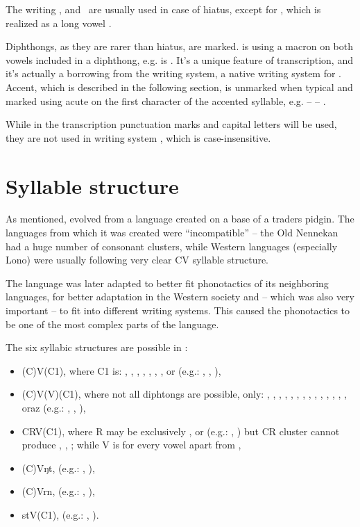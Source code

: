 \skipline

The writing ,  and~ are usually used in case of hiatus,
except for , which is realized as a long vowel .

Diphthongs, as they are rarer than hiatus, are marked.  is using
a macron on both vowels included in a diphthong, e.g.  is . It's a
unique feature of transcription, and it's actually a borrowing from the
 writing system, a native writing system for \andro. Accent, which
is described in the following section, is unmarked when typical and marked using
acute on the first character of the accented syllable, e.g. 
--  -- .

While in the transcription punctuation marks and capital letters will be used,
they are not used in writing system , which is case-insensitive.

\section{Syllable structure}

As mentioned, \andro evolved from a language created on a base of a traders
pidgin. The languages from which it was created were ``incompatible'' -- the Old
Nennekan had a huge number of consonant clusters, while Western languages
(especially Lono) were usually following very clear CV syllable structure.

The language was later adapted to better fit phonotactics of its neighboring
languages, for better adaptation in the Western society and -- which was also
very important -- to fit into different writing systems. This caused the
phonotactics to be one of the most complex parts of the language.

The six syllabic structures are possible in \andro:

\begin{itemize}
    \item (C)V(C1), where C1 is: , , , , , , ,  or  (e.g.: , , ),
    \item (C)V(V)(C1), where not all diphtongs are possible, only: , , , , , , , , , , , , , ,  oraz  (e.g.: , , ),
    \item CRV(C1), where R may be exclusively ,  or  (e.g.: , ) but CR cluster cannot produce , , ; while V is for every vowel apart from ,
    \item (C)Vŋt, (e.g.: , ),
    \item (C)Vrn, (e.g.: , ),
    \item stV(C1), (e.g.: , ).
\end{itemize}

